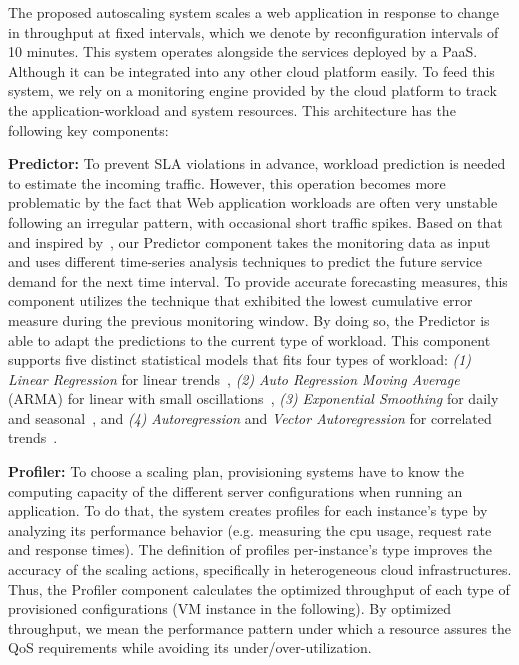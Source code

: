 \label{sec:approach}

The proposed autoscaling system scales a web application in response to change in throughput at fixed intervals, which we denote by reconfiguration intervals of 10 minutes.  This system operates alongside the services deployed by a PaaS. Although it can be integrated into any other cloud platform easily. To feed this system, we rely on a monitoring engine provided by the cloud platform to track the application-workload and system resources. This architecture has the following key components:



\vspace{2mm}

\textbf{Predictor: } To prevent SLA violations in advance, workload prediction is needed to estimate the incoming traffic. However, this operation becomes more problematic by the fact that Web application workloads are often very unstable following an irregular pattern, with occasional short traffic spikes. Based on that and inspired by~\cite{wolski_network_1999}, our Predictor component takes the monitoring data as input and uses different time-series analysis techniques to predict the future service demand for the next time interval. To provide accurate forecasting measures, this component utilizes the technique that exhibited the lowest cumulative error measure during the previous monitoring window. By doing so, the Predictor is able to adapt the predictions to the current type of workload. This component supports five distinct statistical models that fits four types of workload: \emph{(1)} \emph{Linear Regression} for linear trends~\cite{muppala_regression-based_2012}, \emph{(2)} \emph{Auto Regression Moving Average} (ARMA) for linear with small oscillations~\cite{roy_efficient_2011}, \emph{(3)} \emph{Exponential Smoothing} for daily and seasonal~\cite{exponential_smoothing2010}, and \emph{(4)} \emph{Autoregression} and \emph{Vector Autoregression} for correlated trends~\cite{vector_autoregression_2006,chandra_dynamic_2003}. 


\vspace{2mm}

\textbf{Profiler: } To choose a scaling plan, provisioning systems have to know the computing capacity of the different server configurations when running an application. To do that, the system creates profiles for each instance's type by analyzing its performance behavior (e.g. measuring the cpu usage, request rate and response times).  The definition of profiles per-instance's type improves the accuracy of the scaling actions, specifically in heterogeneous cloud infrastructures. Thus, the Profiler component calculates the optimized throughput of each type of provisioned configurations (VM instance in the following). By optimized throughput, we mean the performance pattern under which a resource assures the QoS requirements while avoiding its under/over-utilization.

